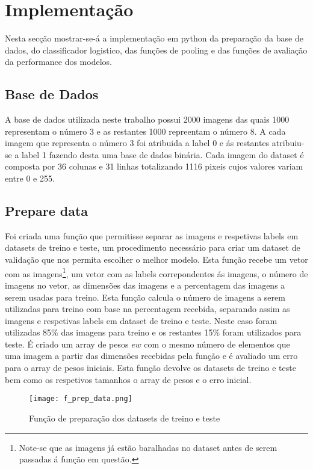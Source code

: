 \section{Implementação}

Nesta secção mostrar-se-á a implementação em python da preparação da base de dados, do classificador logistico, das funções de pooling e das funções de avaliação da performance dos modelos.

\subsection{Base de Dados}

A base de dados utilizada neste trabalho possui 2000 imagens das quais 1000 representam o número 3 e as restantes 1000 repreentam o número 8. A cada imagem que representa o número 3 foi atribuida a label 0 e ás restantes atribuiu-se a label 1 fazendo desta uma base de dados binária.\newline
Cada imagem do dataset é composta por 36 colunas e 31 linhas totalizando 1116 pixeis cujos valores variam entre 0 e 255.


\subsection{Prepare data}

Foi criada uma função que permitisse separar as imagens e respetivas labels em datasets de treino e teste, um procedimento necessário para criar um dataset de validação que nos permita escolher o melhor modelo\cite{ref2,ref6}. Esta função recebe um vetor com as imagens\footnote{Note-se que as imagens já estão baralhadas no dataset antes de serem passadas á função em questão.}, um vetor com as labels correpondentes ás imagens, o número de imagens no vetor, as dimensões das imagens e a percentagem das imagens a serem usadas para treino.\newline
Esta função calcula o número de imagens a serem utilizadas para treino com base na percentagem recebida, separando assim as imagens e respetivas labels em dataset de treino e teste. Neste caso foram utilizadas 85\% das imagens para treino e os restantes 15\% foram utilizados para teste\cite{ref6}. \newline
É criado um array de pesos $ew$ com o mesmo número de elementos que uma imagem a partir das dimensões recebidas pela função e é avaliado um erro para o array de pesos iniciais.\newline
Esta função devolve os datasets de treino e teste bem como os respetivos tamanhos o array de pesos e o erro inicial.
\begin{figure}[H]

  \centering
  \captionsetup{justification=centering}

  \texttt{[image: f\_prep\_data.png]}
  
  \caption {Função de preparação dos datasets de treino e teste}
\end{figure}

